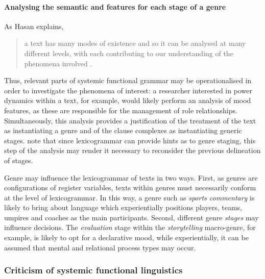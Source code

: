			\paragraph{Analysing the semantic and  features for each stage of a genre}

			As Hasan explains,

			\begin{quote}\singlespacing\small
			a text has many modes of existence and so it can be analysed at many different levels, with each contributing to our understanding of the phenomena involved \citeyear[p.~116]{halliday_language_1989}.
			\end{quote}

			\noindent Thus, relevant parts of systemic functional grammar may be operationalised in order to investigate the phenomena of interest: a researcher interested in power dynamics within a text, for example, would likely perform an analysis of mood features, as these are responsible for the management of role relationships. Simultaneously, this analysis provides a justification of the treatment of the text as instantiating a genre and of the clause complexes as instantiating generic stages. \textcite{eggins_analysing_2004} note that since lexicogrammar can provide hints as to genre staging, this step of the analysis may render it necessary to reconsider the previous delineation of stages.

			Genre may influence the lexicogrammar of texts in two ways. First, as genres are configurations of register variables, texts within genres must necessarily conform at the level of lexicogrammar. In this way, a genre such as \emph{sports commentary} is likely to bring about language which experientially positions players, teams, umpires and coaches as the main participants. Second, different genre \emph{stages} may influence  decisions. The \emph{evaluation} stage within the \emph{storytelling} macro-genre, for example, is likely to opt for a declarative mood, while experientially, it can be assumed that mental and relational process types may occur.

	  \subsubsection{Criticism of systemic functional linguistics}

